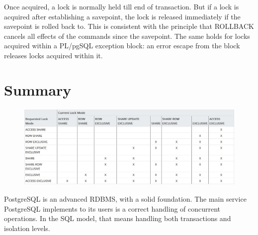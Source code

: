 \documentclass[paper=letter, fontsize=12pt]{article}
\begin{document}
Once acquired, a lock is normally held till end of transaction. But if a lock is acquired after establishing a savepoint, the lock is released immediately if the savepoint is rolled back to. This is consistent with the principle that ROLLBACK cancels all effects of the commands since the savepoint. The same holds for locks acquired within a PL/pgSQL exception block: an error escape from the block releases locks acquired within it.



\section{Summary}
\begin{figure}[h]
	\setlength{\parindent}{-10em} 
	\includegraphics[width=600px]{assets/conflict-lock}
\end{figure}
PostgreSQL is an advanced RDBMS, with a solid foundation. The main service PostgreSQL implements to its users is a correct handling of concurrent operations. In the SQL model, that means handling both transactions and isolation levels.
\end{document}
